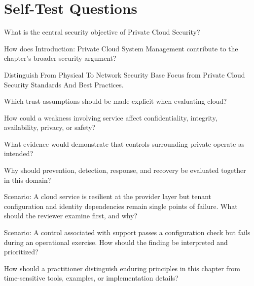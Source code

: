 \documentclass[11pt,letterpaper]{article}
\begin{document}
\section*{Self-Test Questions}
\begin{CornellRecallList}
\item What is the central security objective of Private Cloud Security?
\item How does Introduction: Private Cloud System Management contribute to the chapter's broader security argument?
\item Distinguish From Physical To Network Security Base Focus from Private Cloud Security Standards And Best Practices.
\item Which trust assumptions should be made explicit when evaluating cloud?
\item How could a weakness involving service affect confidentiality, integrity, availability, privacy, or safety?
\item What evidence would demonstrate that controls surrounding private operate as intended?
\item Why should prevention, detection, response, and recovery be evaluated together in this domain?
\item Scenario: A cloud service is resilient at the provider layer but tenant configuration and identity dependencies remain single points of failure. What should the reviewer examine first, and why?
\item Scenario: A control associated with support passes a configuration check but fails during an operational exercise. How should the finding be interpreted and prioritized?
\item How should a practitioner distinguish enduring principles in this chapter from time-sensitive tools, examples, or implementation details?
\end{CornellRecallList}
\end{document}
